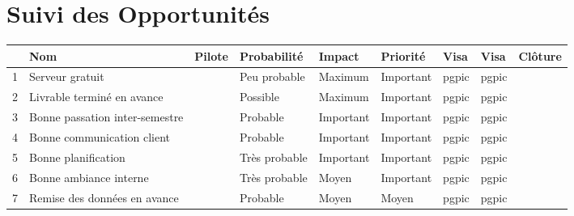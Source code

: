 \documentclass[asi]{picINSA}
\begin{document}
\chapter*{Suivi des Opportunités}

\begin{longtable}{|p{0.3cm}|p{2.5cm}|p{2cm}|p{2cm}|p{1.8cm}|p{1.5cm}|p{1cm}|p{1cm}|p{1.5cm}|}
			\hline
			\rowcolor{gray!40}
			\No & Nom & Pilote & Probabilité & Impact & Priorité & Visa \RQCourt{} & Visa \CPCourt{} & Clôture \\\hline
			 1 & Serveur gratuit & \Matthieu & Peu probable & Maximum & Important & pgpic & pgpic & \\\hline
			 2 & Livrable terminé en avance & \Kafui & Possible & Maximum & Important & pgpic & pgpic & \\\hline
			 3 & Bonne passation inter-semestre & \Pierre & Probable & Important & Important & pgpic & pgpic & \\\hline
			 4 & Bonne communication client & \Florian & Probable & Important & Important & pgpic & pgpic & \\\hline
			 5 & Bonne planification & \Pierre & Très probable & Important & Important & pgpic & pgpic & \\\hline
			 6 & Bonne ambiance interne & \Michel & Très probable & Moyen & Important & pgpic & pgpic & \\\hline
			 7 & Remise des données en avance & \Sergi & Probable & Moyen & Moyen & pgpic & pgpic &  \\\hline
\end{longtable}
\end{document}
